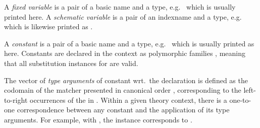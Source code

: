 \begin{isabellebody}
\begin{isamarkuptext}
  A \emph{fixed variable} is a pair of a basic name and a type, e.g.\
   which is usually printed  here.  A
  \emph{schematic variable} is a pair of an indexname and a type,
  e.g.\  which is likewise printed as .

  \medskip A \emph{constant} is a pair of a basic name and a type,
  e.g.\  which is usually printed as 
  here.  Constants are declared in the context as polymorphic families
  \isa{c\ {\isacharcolon}{\isacharcolon}\ {\isasymsigma}}, meaning that all substitution instances  for \isa{{\isasymtau}\ {\isacharequal}\ {\isasymsigma}{\isasymvartheta}} are valid.

  The vector of \emph{type arguments} of constant  wrt.\
  the declaration  is defined as the codomain of the
  matcher  presented in
  canonical order , corresponding to the
  left-to-right occurrences of the \isa{{\isasymalpha}\isactrlisub i} in \isa{{\isasymsigma}}.
  Within a given theory context, there is a one-to-one correspondence
  between any constant \isa{c\isactrlisub {\isasymtau}} and the application  of its type arguments.  For example, with , the instance  corresponds to
  \isa{plus{\isacharparenleft}nat{\isacharparenright}}.


\end{isamarkuptext}
\end{isabellebody}
